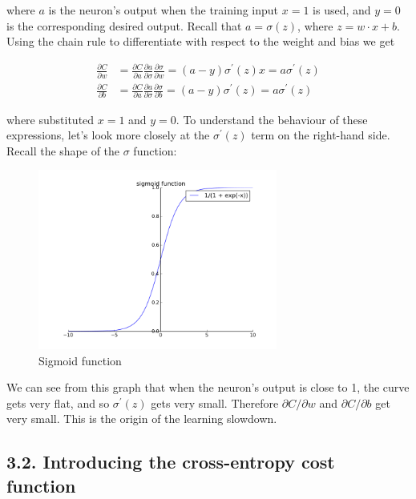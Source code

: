 \documentclass[12 pt]{article}
\begin{document}
where $ a $ is the neuron's output when the training input $ x = 1 $
is used, and $ y = 0 $ is the corresponding desired output. Recall
that $ a = \sigma(z) $, where $ z = w \cdot x + b $. Using the chain rule to
differentiate with respect to the weight and bias we get

\begin{equation}
    \begin{split}
        \frac {\partial C}{\partial w} &= \frac {\partial C}{\partial a}
        \frac {\partial a}{\partial \sigma} \frac {\partial \sigma}{\partial w} =
        (a - y) \sigma^\prime(z) x = a \sigma^\prime(z) \\
        \frac {\partial C}{\partial b} &= \frac {\partial C}{\partial a}
        \frac {\partial a}{\partial \sigma} \frac {\partial \sigma}{\partial b} =
        (a - y) \sigma^\prime(z) =
        a \sigma^\prime(z)
    \end{split}
\end{equation}

where substituted $ x = 1 $ and $ y = 0
$. To understand the behaviour of these expressions, let's look more closely at the $
\sigma^{\prime} (z) $ term on the right-hand side. Recall the shape of
the $ \sigma $ function:

\begin{figure}[htp]
\centering
\includegraphics[width=0.7\textwidth]{./figs/sigmoid_function.png}
\caption{Sigmoid function}
\end{figure}

We can see from this graph that when the neuron's output is close to 1,
the curve gets very flat, and so $ \sigma^{\prime} (z) $ gets very
small. Therefore $ \partial C / \partial w $ and $ \partial C /
\partial b $ get very small. This is the origin of the learning
slowdown.

\subsection{3.2. Introducing the cross-entropy cost function}
\label{introducing-the-cross-entropy-cost-function}
\end{document}
